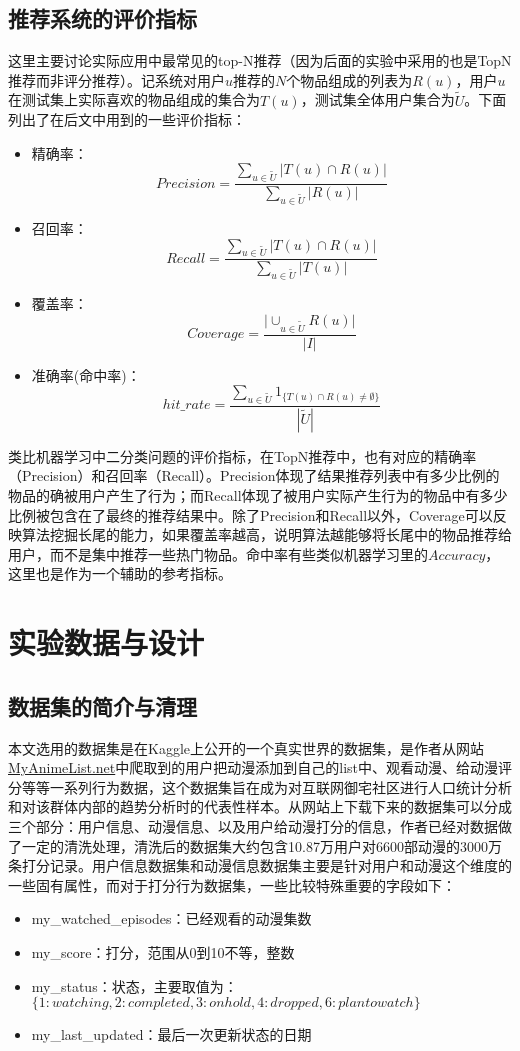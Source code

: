 \documentclass{article}
\begin{document}
	\subsection{推荐系统的评价指标}
	这里主要讨论实际应用中最常见的top-N推荐（因为后面的实验中采用的也是TopN推荐而非评分推荐）。记系统对用户$u$推荐的$N$个物品组成的列表为$R(u)$，用户$u$在测试集上实际喜欢的物品组成的集合为$T(u)$，测试集全体用户集合为$\tilde{U}$。下面列出了在后文中用到的一些评价指标：
	\begin{itemize}
		\item 精确率：$$Precision = \frac{\sum\limits_{u\in\tilde{U}}|T(u)\cap R(u)|}{\sum\limits_{u\in\tilde{U}}|R(u)|}$$
		\item 召回率：$$Recall = \frac{\sum\limits_{u\in\tilde{U}}|T(u)\cap R(u)|}{\sum\limits_{u\in\tilde{U}}|T(u)|}$$
		\item 覆盖率：$$Coverage = \frac{\big|\cup_{u\in\tilde{U}}R(u)\big|}{|I|}$$
		\item 准确率(命中率)：$$hit\_rate=\frac{\sum\limits_{u\in\tilde{U}}1_{\{T(u)\cap R(u) \neq\emptyset\}}}{|\tilde{U}|}$$
	\end{itemize}

	类比机器学习中二分类问题的评价指标，在TopN推荐中，也有对应的精确率（Precision）和召回率（Recall）。Precision体现了结果推荐列表中有多少比例的物品的确被用户产生了行为；而Recall体现了被用户实际产生行为的物品中有多少比例被包含在了最终的推荐结果中。除了Precision和Recall以外，Coverage可以反映算法挖掘长尾的能力，如果覆盖率越高，说明算法越能够将长尾中的物品推荐给用户，而不是集中推荐一些热门物品。命中率有些类似机器学习里的$Accuracy$，这里也是作为一个辅助的参考指标。

\section{实验数据与设计}
	\subsection{数据集的简介与清理}
	本文选用的数据集是在Kaggle上公开的一个真实世界的数据集，是作者从网站\url{MyAnimeList.net}中爬取到的用户把动漫添加到自己的list中、观看动漫、给动漫评分等等一系列行为数据，这个数据集旨在成为对互联网御宅社区进行人口统计分析和对该群体内部的趋势分析时的代表性样本。从网站上下载下来的数据集可以分成三个部分：用户信息、动漫信息、以及用户给动漫打分的信息，作者已经对数据做了一定的清洗处理，清洗后的数据集大约包含10.87万用户对6600部动漫的3000万条打分记录。用户信息数据集和动漫信息数据集主要是针对用户和动漫这个维度的一些固有属性，而对于打分行为数据集，一些比较特殊重要的字段如下：
	\begin{itemize}
		\item my\_watched\_episodes：已经观看的动漫集数
		\item my\_score：打分，范围从0到10不等，整数
		\item my\_status：状态，主要取值为：$\{1:watching, 2:completed, 3:on hold, 4:dropped, 6:plan to watch\}$
		\item my\_last\_updated：最后一次更新状态的日期
	\end{itemize}
\end{document}

